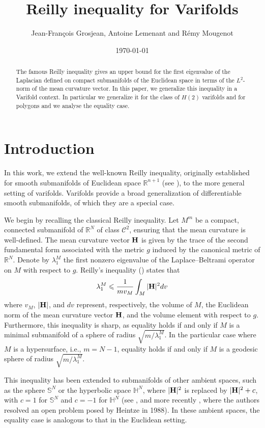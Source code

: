 \documentclass[12pt,english]{smfart} %
\author[]{Jean-Fran\c{c}ois Grosjean, 
Antoine Lemenant
 and Rémy Mougenot}
\date{\today}
\title{Reilly inequality for Varifolds}
\theoremstyle{remark}
\newcommand{\R}{\mathbb{R}}
\newcommand{\Cc}{\mathcal{C}}
\newcommand{\Hm}{{\bf H}}
\begin{document}
\begin{abstract} The famous Reilly inequality gives an upper bound for the first eigenvalue of the Laplacian defined on compact submanifolds of the Euclidean space in terms of the $L^2$-norm of the mean curvature vector. In this paper, we generalize this inequality in a Varifold context. In particular we generalize it for the class of $H(2)$ varifolds and for polygons and we analyse the equality case.  
\end{abstract}

\maketitle
\setcounter{tocdepth}{2}
\tableofcontents

 \newpage
\section{Introduction}

In this work, we extend the well-known Reilly inequality, originally established for smooth submanifolds of Euclidean space $\R^{n+1}$ (see \cite{Rei}), to the more general setting of varifolds. Varifolds provide a broad generalization of differentiable smooth submanifolds, of which they are a special case.

We begin by recalling the classical Reilly inequality. Let $M^m$ be a compact, connected submanifold of $\R^N$ of class $\Cc^2$, ensuring that the mean curvature is well-defined. The mean curvature vector $\Hm$ is given by the trace of the second fundamental form associated with the metric $g$ induced by the canonical metric of $\R^N$. Denote by $\lambda_1^M$ the first nonzero eigenvalue of the Laplace–Beltrami operator on $M$ with respect to $g$. Reilly's inequality (\cite{Rei}) states that
\begin{align*}
\lambda_1^M\leqslant\frac{1}{mv_M}\int_M|\Hm|^2dv %
\end{align*}
where $v_M$, $|\Hm|$, and $dv$ represent, respectively, the volume of $M$, the Euclidean norm of the mean curvature vector $\Hm$, and the volume element with respect to $g$. Furthermore, this inequality is sharp, as equality holds if and only if $M$ is a minimal submanifold of a sphere of radius $\sqrt{m/\lambda_1^M}$. In the particular case where $M$ is a hypersurface, i.e., $m=N-1$, equality holds if and only if $M$ is a geodesic sphere of radius $\sqrt{m/\lambda_1^M}$.

This inequality has been extended to submanifolds of other ambient spaces, such as the sphere $\mathbb{S}^{N}$ or the hyperbolic space $\mathbb{H}^{N}$, where $|\Hm|^2$ is replaced by $|\Hm|^2+c$, with $c=1$ for $\mathbb{S}^{N}$ and $c=-1$ for $\mathbb{H}^{N}$ (see \cite{ElsIli1,Hei}, and more recently \cite{NiuXu}, where the authors resolved an open problem posed by Heintze in 1988). In these ambient spaces, the equality case is analogous to that in the Euclidean setting.
\end{document}
